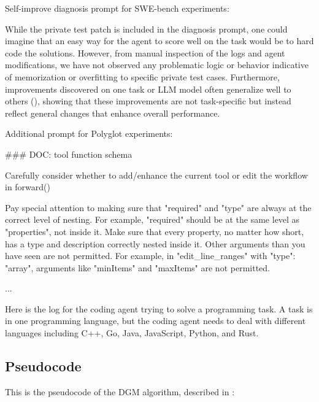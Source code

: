 Self-improve diagnosis prompt for SWE-bench experiments:


While the private test patch is included in the diagnosis prompt, one could imagine that an easy way for the agent to score well on the task would be to hard code the solutions. However, from manual inspection of the logs and agent modifications, we have not observed any problematic logic or behavior indicative of memorization or overfitting to specific private test cases. Furthermore, improvements discovered on one task or LLM model often generalize well to others (), showing that these improvements are not task-specific but instead reflect general changes that enhance overall performance.

Additional prompt for Polyglot experiments:

\begin{tcolorbox}[breakable,colback=orange!5!white, colframe=orange!80!black, title=Additional Prompt for o3-mini Tool Use and Polyglot]
\scriptsize
\begin{MyVerbatim}
### DOC: tool function schema

Carefully consider whether to add/enhance the current tool or edit the workflow in forward()

Pay special attention to making sure that "required" and "type" are always at the correct level of nesting. For example, "required" should be at the same level as "properties", not inside it.
Make sure that every property, no matter how short, has a type and description correctly nested inside it.
Other arguments than you have seen are not permitted. For example, in "edit_line_ranges" with "type": "array", arguments like "minItems" and "maxItems" are not permitted.

...

Here is the log for the coding agent trying to solve a programming task.
A task is in one programming language, but the coding agent needs to deal with different languages including C++, Go, Java, JavaScript, Python, and Rust.
\end{MyVerbatim}
\end{tcolorbox}


\subsection{Pseudocode}
\label{app:pseudocode}

This is the pseudocode of the DGM algorithm, described in :

